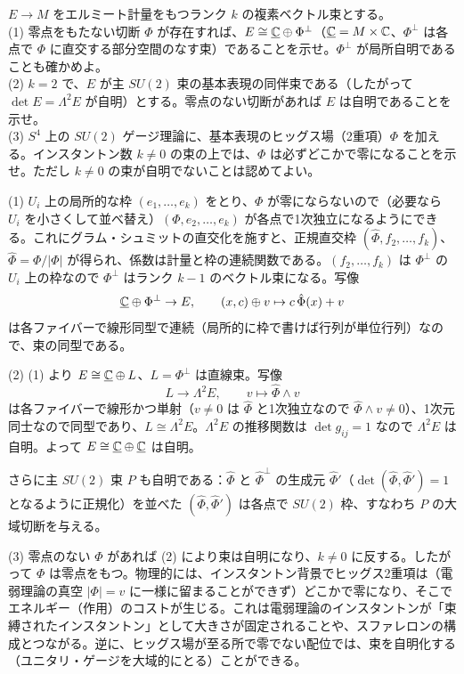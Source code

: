 \begin{problem}[難易度 C]\label{ch07-prob-higgssplit}
$E\to M$ をエルミート計量をもつランク $k$ の複素ベクトル束とする。\\
(1) 零点をもたない切断 $\Phi$ が存在すれば、$E\cong\underline{\mathbb{C}}\oplus\Phi^\perp$（$\underline{\mathbb{C}}=M\times\mathbb{C}$、$\Phi^\perp$ は各点で $\Phi$ に直交する部分空間のなす束）であることを示せ。$\Phi^\perp$ が局所自明であることも確かめよ。\\
(2) $k=2$ で、$E$ が主 $SU(2)$ 束の基本表現の同伴束である（したがって $\det E=\Lambda^2E$ が自明）とする。零点のない切断があれば $E$ は自明であることを示せ。\\
(3) $S^4$ 上の $SU(2)$ ゲージ理論に、基本表現のヒッグス場（2重項）$\Phi$ を加える。インスタントン数 $k\neq0$ の束の上では、$\Phi$ は必ずどこかで零になることを示せ。ただし $k\neq0$ の束が自明でないことは認めてよい。
\end{problem}

\begin{solution}
(1) $U_i$ 上の局所的な枠 $(e_1,\dots,e_k)$ をとり、$\Phi$ が零にならないので（必要なら $U_i$ を小さくして並べ替え）$(\Phi,e_2,\dots,e_k)$ が各点で1次独立になるようにできる。これにグラム・シュミットの直交化を施すと、正規直交枠 $(\hat\Phi,f_2,\dots,f_k)$、$\hat\Phi=\Phi/\lvert\Phi\rvert$ が得られ、係数は計量と枠の連続関数である。$(f_2,\dots,f_k)$ は $\Phi^\perp$ の $U_i$ 上の枠なので $\Phi^\perp$ はランク $k-1$ のベクトル束になる。写像
\[
\underline{\mathbb{C}}\oplus\Phi^\perp\to E,\qquad (x,c)\oplus v\mapsto c\,\hat\Phi(x)+v
\]
は各ファイバーで線形同型で連続（局所的に枠で書けば行列が単位行列）なので、束の同型である。

(2) (1) より $E\cong\underline{\mathbb{C}}\oplus L$、$L=\Phi^\perp$ は直線束。写像
\[
L\to\Lambda^2E,\qquad v\mapsto\hat\Phi\wedge v
\]
は各ファイバーで線形かつ単射（$v\neq0$ は $\hat\Phi$ と1次独立なので $\hat\Phi\wedge v\neq0$）、1次元同士なので同型であり、$L\cong\Lambda^2E$。$\Lambda^2E$ の推移関数は $\det g_{ij}=1$ なので $\Lambda^2E$ は自明。よって $E\cong\underline{\mathbb{C}}\oplus\underline{\mathbb{C}}$ は自明。

さらに主 $SU(2)$ 束 $P$ も自明である：$\hat\Phi$ と $\hat\Phi^\perp$ の生成元 $\hat\Phi'$（$\det(\hat\Phi,\hat\Phi')=1$ となるように正規化）を並べた $(\hat\Phi,\hat\Phi')$ は各点で $SU(2)$ 枠、すなわち $P$ の大域切断を与える。

(3) 零点のない $\Phi$ があれば (2) により束は自明になり、$k\neq0$ に反する。したがって $\Phi$ は零点をもつ。物理的には、インスタントン背景でヒッグス2重項は（電弱理論の真空 $\lvert\Phi\rvert=v$ に一様に留まることができず）どこかで零になり、そこでエネルギー（作用）のコストが生じる。これは電弱理論のインスタントンが「束縛されたインスタントン」として大きさが固定されることや、スファレロンの構成とつながる。逆に、ヒッグス場が至る所で零でない配位では、束を自明化する（ユニタリ・ゲージを大域的にとる）ことができる。
\end{solution}

